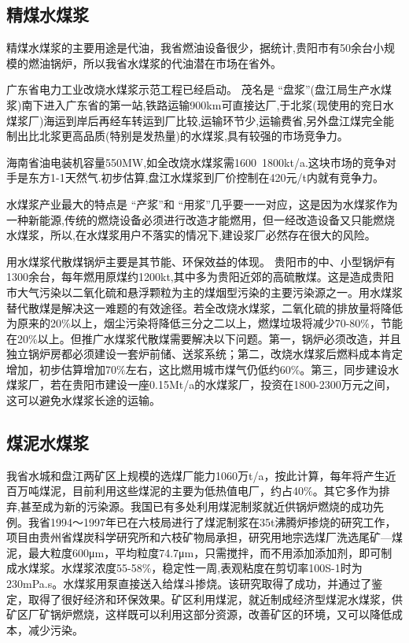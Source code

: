 \documentclass[10pt,openany]{ctexbook}
\begin{document}
\subsection{精煤水煤浆}
    精煤水煤浆的主要用途是代油，我省燃油设备很少，据统计,贵阳市有50余台小规模的燃油锅炉，所以我省水煤浆的代油潜在市场在省外。\par
      广东省电力工业改烧水煤浆示范工程已经启动。
      茂名是 “盘浆”(盘江局生产水煤浆)南下进入广东省的第一站,铁路运输900km可直接达厂,于北浆(现使用的兖日水煤浆厂)海运到岸后再经车转运到厂比较,运输环节少,运输费省,另外盘江煤完全能制出比北浆更高品质(特别是发热量)的水煤浆,具有较强的市场竞争力。 \par
    海南省油电装机容量550MW,如全改烧水煤浆需1600~1800kt/a.这块市场的竞争对手是东方1-1天然气.初步估算,盘江水煤浆到厂价控制在420元/t内就有竞争力。\par
    水煤浆产业最大的特点是 “产浆”和 “用浆”几乎要一一对应，这是因为水煤浆作为一种新能源,传统的燃烧设备必须进行改造才能燃用，但一经改造设备又只能燃烧水煤浆，所以,在水煤浆用户不落实的情况下,建设浆厂必然存在很大的风险。\par
    用水煤浆代散煤锅炉主要是其节能、环保效益的体现。
    贵阳市的中、小型锅炉有1300余台，每年燃用原煤约1200kt,其中多为贵阳近郊的高硫散煤。这是造成贵阳市大气污染以二氧化硫和悬浮颗粒为主的煤烟型污染的主要污染源之一。用水煤浆替代散煤是解决这一难题的有效途径。若全改烧水煤浆，二氧化硫的排放量将降低为原来的20\%以上，烟尘污染将降低三分之二以上，燃煤垃圾将减少70-80\%，节能在20\%以上。但推广水煤浆代散煤需要解决以下问题。第一，锅炉必须改造，并且独立锅炉房都必须建设一套炉前储、送浆系统；第二，改烧水煤浆后燃料成本肯定增加，初步估算增加70\%左右，这比燃用城市煤气仍低约60\%。第三，同步建设水煤浆厂，若在贵阳市建设一座0.15Mt/a的水煤浆厂，投资在1800-2300万元之间，这可以避免水煤浆长途的运输。
    \subsection{煤泥水煤浆}
  我省水城和盘江两矿区上规模的选煤厂能力1060万t/a，按此计算，每年将产生近百万吨煤泥，目前利用这些煤泥的主要为低热值电厂，约占40\%。其它多作为排弃,甚至成为新的污染源。我国已有多处利用煤泥制浆就近供锅炉燃烧的成功先例。我省1994～1997年已在六枝局进行了煤泥制浆在35t沸腾炉掺烧的研究工作，项目由贵州省煤炭科学研究所和六枝矿物局承担，研究用地宗选煤厂洗选尾矿---煤泥，最大粒度600μm，平均粒度74.7μm，只需搅拌，而不用添加添加剂，即可制成水煤浆。水煤浆浓度55-58\%，稳定性一周,表观粘度在剪切率100S-1时为230mPa.s。水煤浆用泵直接送入给煤斗掺烧。该研究取得了成功，并通过了鉴定，取得了很好经济和环保效果。矿区利用煤泥，就近制成经济型煤泥水煤浆，供矿区厂矿锅炉燃烧，这样既可以利用这部分资源，改善矿区的环境，又可以降低成本，减少污染。
\end{document}
